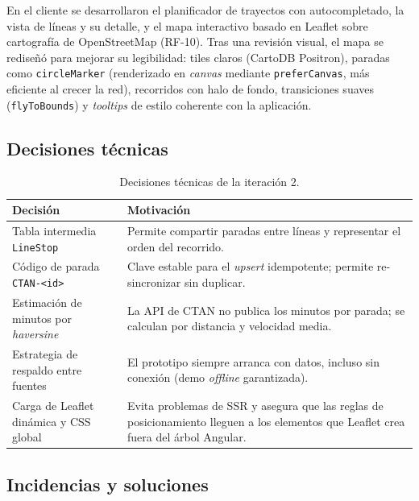 En el cliente se desarrollaron el planificador de trayectos con autocompletado, la vista de líneas y su detalle, y el mapa interactivo basado en Leaflet sobre cartografía de OpenStreetMap (RF-10). Tras una revisión visual, el mapa se rediseñó para mejorar su legibilidad: tiles claros (CartoDB Positron), paradas como \texttt{circleMarker} (renderizado en \textit{canvas} mediante \texttt{preferCanvas}, más eficiente al crecer la red), recorridos con halo de fondo, transiciones suaves (\texttt{flyToBounds}) y \textit{tooltips} de estilo coherente con la aplicación.

\subsection{Decisiones técnicas}

\begin{table}[h!]
\centering
\small
\begin{tabular}{|p{5.5cm}|p{8.5cm}|}
\hline
\textbf{Decisión} & \textbf{Motivación} \\ \hline
Tabla intermedia \texttt{LineStop} & Permite compartir paradas entre líneas y representar el orden del recorrido. \\ \hline
Código de parada \texttt{CTAN-<id>} & Clave estable para el \textit{upsert} idempotente; permite re-sincronizar sin duplicar. \\ \hline
Estimación de minutos por \textit{haversine} & La API de CTAN no publica los minutos por parada; se calculan por distancia y velocidad media. \\ \hline
Estrategia de respaldo entre fuentes & El prototipo siempre arranca con datos, incluso sin conexión (demo \textit{offline} garantizada). \\ \hline
Carga de Leaflet dinámica y CSS global & Evita problemas de SSR y asegura que las reglas de posicionamiento lleguen a los elementos que Leaflet crea fuera del árbol Angular. \\ \hline
\end{tabular}
\caption{Decisiones técnicas de la iteración 2.}
\label{tab:dec-it2}
\end{table}

\subsection{Incidencias y soluciones}

